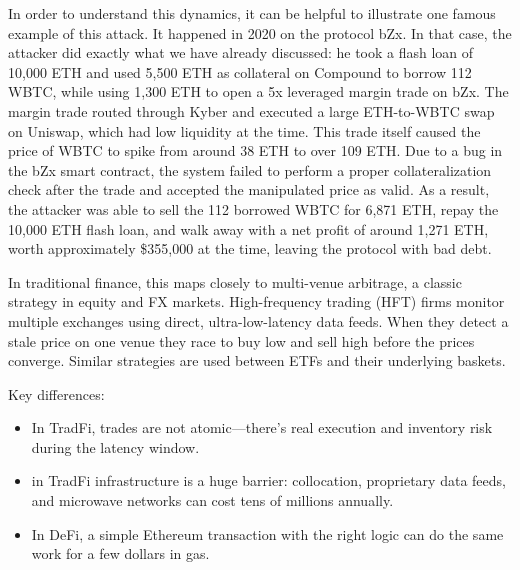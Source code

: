 \documentclass[a4paper,11pt]{article}
\begin{document}
In order to understand this dynamics, it can be helpful to illustrate one famous example of this attack. It happened in 2020 on the protocol bZx. In that case, the attacker did exactly what we have already discussed: he took a flash loan of 10,000 ETH and used 5,500 ETH as collateral on Compound to borrow 112 WBTC, while using 1,300 ETH to open a 5x leveraged margin trade on bZx. The margin trade routed through Kyber and executed a large ETH-to-WBTC swap on Uniswap, which had low liquidity at the time. This trade itself caused the price of WBTC to spike from around 38 ETH to over 109 ETH. Due to a bug in the bZx smart contract, the system failed to perform a proper collateralization check after the trade and accepted the manipulated price as valid. As a result, the attacker was able to sell the 112 borrowed WBTC for 6,871 ETH, repay the 10,000 ETH flash loan, and walk away with a net profit of around 1,271 ETH, worth approximately \$355,000 at the time, leaving the protocol with bad debt.

In traditional finance, this maps closely to multi-venue arbitrage, a classic strategy in equity and FX markets. High-frequency trading (HFT) firms monitor multiple exchanges using direct, ultra-low-latency data feeds. When they detect a stale price on one venue they race to buy low and sell high before the prices converge. Similar strategies are used between ETFs and their underlying baskets.

Key differences:
\begin{itemize}
    \item In TradFi, trades are not atomic—there’s real execution and inventory risk during the latency window.
    \item in TradFi infrastructure is a huge barrier: collocation, proprietary data feeds, and microwave networks can cost tens of millions annually.
    \item In DeFi, a simple Ethereum transaction with the right logic can do the same work for a few dollars in gas.
\end{itemize}

\end{document}
